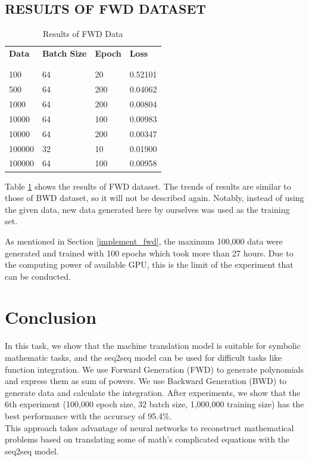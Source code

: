 \documentclass{article} %
\begin{document}
\subsection{RESULTS OF FWD DATASET}

\begin{table}[h]
\caption{Results of FWD Data}
\label{fwd_result}
\begin{center}
\begin{tabular}{llll}
\textbf{Data} & \textbf{Batch Size} & \textbf{Epoch} & \textbf{Loss}\\
\\ \hline \\
100 & 64 & 20 & 0.52101 \\
500 & 64  & 200  & 0.04062 \\
1000 & 64  & 200  & 0.00804 \\
10000 & 64  & 100  & 0.00983 \\
10000 & 64 & 200  & 0.00347 \\
100000 & 32 & 10  & 0.01900 \\
100000 & 64 & 100  & 0.00958 \\
\end{tabular}
\end{center}
\end{table}

Table \ref{fwd_result} shows the results of FWD dataset. The trends of results are similar to those of BWD dataset, so it will not be described again. Notably, instead of using the given data, new data generated here by ourselves was used as the training set.

As mentioned in Section \ref{implement_fwd}, the maximum 100,000 data were generated and trained with 100 epochs which took more than 27 hours. Due to the computing power of available GPU, this is the limit of the experiment that can be conducted.

\section{Conclusion}
In this task, we show that the machine translation model is suitable for symbolic mathematic tasks, and the seq2seq model can be used for difficult tasks like function integration. We use Forward Generation (FWD) to generate polynomials and express them as sum of powers. We use Backward Generation (BWD) to generate data and calculate the integration. After experiments, we show that the 6th experiment (100,000 epoch size, 32 batch size, 1,000,000 training size) has the best performance with the accuracy of 95.4\%. \\
This approach takes advantage of neural networks to reconstruct mathematical problems based on translating some of math’s complicated equations with the seq2seq model.



\end{document}
